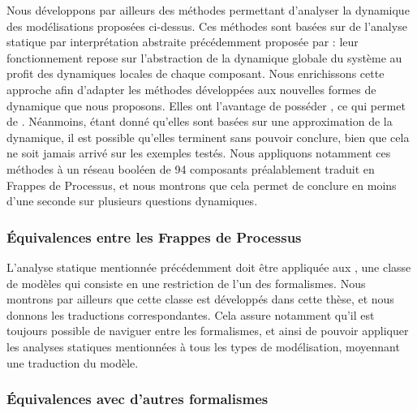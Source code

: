 Nous développons par ailleurs des méthodes permettant d'analyser la dynamique
des modélisations proposées ci-dessus.
Ces méthodes sont basées sur de l'analyse statique par interprétation abstraite
précédemment proposée par  :
leur fonctionnement repose sur l'abstraction de la dynamique globale du système
au profit des dynamiques locales de chaque composant.
Nous enrichissons cette approche afin d'adapter les méthodes développées
aux nouvelles formes de dynamique que nous proposons.
Elles ont l'avantage de posséder ,
ce qui permet de .
Néanmoins, étant donné qu'elles sont basées sur une approximation de la dynamique,
il est possible qu'elles terminent sans pouvoir conclure,
bien que cela ne soit jamais arrivé sur les exemples testés.
Nous appliquons notamment ces méthodes à un réseau booléen de 94 composants
préalablement traduit en Frappes de Processus,
et nous montrons que cela permet de conclure
en moins d'une seconde sur plusieurs questions dynamiques.

\subsubsection*{Équivalences entre les Frappes de Processus}

L'analyse statique mentionnée précédemment doit être appliquée
aux ,
une classe de modèles qui consiste en une restriction de l'un des formalismes.
Nous montrons par ailleurs que cette classe est
 développés dans cette thèse,
et nous donnons les traductions correspondantes.
Cela assure notamment qu'il est toujours possible de naviguer entre les formalismes,
et ainsi de pouvoir appliquer les analyses statiques mentionnées à tous les types
de modélisation, moyennant une traduction du modèle.

\subsubsection*{Équivalences avec d'autres formalismes}

